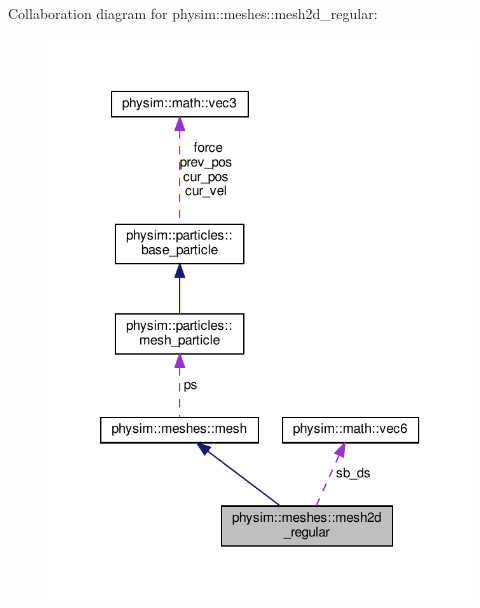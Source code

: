 Collaboration diagram for physim\+:\+:meshes\+:\+:mesh2d\+\_\+regular\+:\nopagebreak
\begin{figure}[H]
\begin{center}
\leavevmode
\includegraphics[width=320pt]{classphysim_1_1meshes_1_1mesh2d__regular__coll__graph}
\end{center}
\end{figure}
